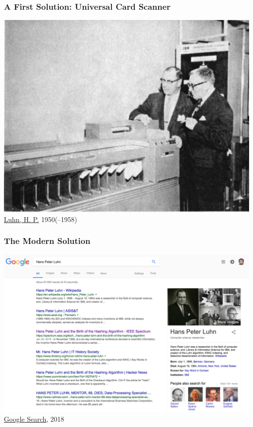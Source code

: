\documentclass[svgnames]{beamer}
\begin{document}
\begin{frame}
    \frametitle{A First Solution: Universal Card Scanner }

    \begin{center}
        \includegraphics[width=.8\linewidth]{luhn}\\
        \raggedleft \footnotesize \href{http://onlinebooks.library.upenn.edu/webbin/book/lookupname?key=Luhn\%2C\%20H\%2E\%20P\%2E\%20\%28Hans\%20Peter\%29\%2C\%201896\%2D1964}{Luhn, H. P.} 1950(--1958)
    \end{center}

\end{frame}

\begin{frame}
    \frametitle{The Modern Solution }

    \begin{center}
        \includegraphics[width=.8\linewidth]{Google-Luhn}\\
        \raggedleft \footnotesize \href{https://www.google.com/search?q=Hans+Peter+Luhn}{Google Search}, 2018
    \end{center}

\end{frame}
\end{document}
